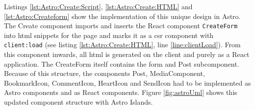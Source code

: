 \documentclass[a4paper, 12pt]{article}
\begin{document}
Listings \ref{lst:Astro:Create:Script}, \ref{lst:Astro:Create:HTML} and \ref{lst:Astro:Createform} show the implementation of this unique design in Astro.
The Create component imports and inserts the React component \verb|CreateForm| into \acrshort{html} snippets for the page and marks it as a \acrshort{csr} component with \verb|client:load| (see listing \ref{lst:Astro:Create:HTML}, line \ref{line:clientLoad}).
From this component inwards, all \acrshort{html} is generated on the client and purely as a React application.
The CreateForm itself contains the form and Post subcomponent.
Because of this structure, the components Post, MediaComponent, BookmarkIcon, CommentIcon, HeartIcon and SendIcon had to be implemented as Astro components and as React components.
Figure \ref{fig:astroUml} shows this updated component structure with Astro Islands.
\end{document}
